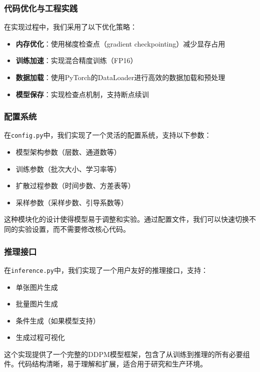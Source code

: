\documentclass{ctexart}
\begin{document}
\subsubsection{代码优化与工程实践}
\noindent
在实现过程中，我们采用了以下优化策略：

\begin{itemize}
    \item \textbf{内存优化}：使用梯度检查点（gradient checkpointing）减少显存占用
    \item \textbf{训练加速}：实现混合精度训练（FP16）
    \item \textbf{数据加载}：使用PyTorch的DataLoader进行高效的数据加载和预处理
    \item \textbf{模型保存}：实现检查点机制，支持断点续训
\end{itemize}

\subsubsection{配置系统}
\noindent
在\texttt{config.py}中，我们实现了一个灵活的配置系统，支持以下参数：

\begin{itemize}
    \item 模型架构参数（层数、通道数等）
    \item 训练参数（批次大小、学习率等）
    \item 扩散过程参数（时间步数、方差表等）
    \item 采样参数（采样步数、引导系数等）
\end{itemize}

\noindent
这种模块化的设计使得模型易于调整和实验。通过配置文件，我们可以快速切换不同的实验设置，而不需要修改核心代码。

\subsubsection{推理接口}
\noindent
在\texttt{inference.py}中，我们实现了一个用户友好的推理接口，支持：

\begin{itemize}
    \item 单张图片生成
    \item 批量图片生成
    \item 条件生成（如果模型支持）
    \item 生成过程可视化
\end{itemize}

\noindent
这个实现提供了一个完整的DDPM模型框架，包含了从训练到推理的所有必要组件。代码结构清晰，易于理解和扩展，适合用于研究和生产环境。
\end{document}
